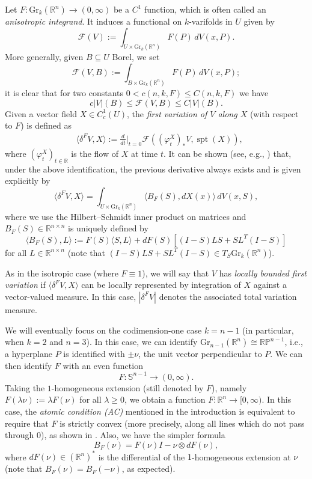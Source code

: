 \documentclass[11pt,a4paper]{amsart}
\newcommand{\R}{\mathbb{R}}
\newcommand{\ang}[1]{\langle#1\rangle}
\theoremstyle{definition}
\newcommand{\gr}{\text{Gr}_k(\R^n)}
\begin{document}
Let $F:\gr\to(0,\infty)$ be a $C^1$ function, which is often called an \emph{anisotropic integrand}.
It induces a functional on $k$-varifolds in $U$ given by
$$\mathcal{F}(V):=\int_{U\times\gr}F(P)\,dV(x,P).$$
More generally, given $B\subseteq U$ Borel, we set
$$\mathcal{F}(V,B):=\int_{B\times\gr}F(P)\,dV(x,P);$$
it is clear that for two constants $0<c(n,k,F)\le C(n,k,F)$ we have
$$c|V|(B)\le\mathcal{F}(V,B)\le C|V|(B).$$
Given a vector field $X\in C^1_c(U)$, the \emph{first variation of $V$ along $X$} (with respect to $F$) is defined as
\begin{align*}
	&\ang{\delta^F V,X}:=\frac{d}{dt}\Big|_{t=0}\mathcal F((\varphi_t^X)_*V,\operatorname{spt}(X)),
\end{align*}
where $(\varphi_t^X)_{t\in\R}$ is the flow of $X$ at time $t$. It can be shown (see, e.g., \cite[Lemma A.2]{DDG}) that, under the above identification, the previous derivative always exists and is given explicitly by
\begin{equation}\label{fv.bf}
    \ang{\delta^F V,X}=\int_{U\times\gr}\ang{B_F(S),dX(x)}\,dV(x,S),
\end{equation}
where we use the Hilbert--Schmidt inner product on matrices and $B_F(S)\in\R^{n\times n}$
is uniquely defined by
\begin{equation}\label{bf}
    \ang{B_F(S),L}:=F(S)\ang{S,L}+dF(S)[(I-S)LS+SL^T(I-S)]
\end{equation}
for all $L\in\R^{n\times n}$ (note that $(I-S)LS+SL^T(I-S)\in T_S\gr$).

As in the isotropic case (where $F\equiv 1$), we will say that $V$ has \emph{locally bounded first variation}
if $\ang{\delta^F V,X}$ can be locally represented by integration of $X$ against a vector-valued measure.
In this case, $|\delta^FV|$ denotes the associated total variation measure.

We will eventually focus on the codimension-one case $k=n-1$ (in particular, when $k=2$ and $n=3$).
In this case, we can identify $\text{Gr}_{n-1}(\R^n)\cong\mathbb{RP}^{n-1}$,
i.e., a hyperplane $P$ is identified with $\pm\nu$, the unit vector perpendicular to $P$.
We can then identify $F$ with an even function
$$F:\mathbb{S}^{n-1}\to(0,\infty).$$
Taking the $1$-homogeneous extension (still denoted by $F$), namely $F(\lambda\nu):=\lambda F(\nu)$
for all $\lambda\ge0$, we obtain a function $F:\R^n\to[0,\infty)$.
In this case, the \emph{atomic condition (AC)} mentioned in the introduction is equivalent to
require that $F$ is strictly convex (more precisely, along all lines which do not pass through $0$), as shown in
\cite[Theorem 1.3]{DDG}.
Also, we have the simpler formula
\begin{equation}\label{bf.hyper}
    B_F(\nu)=F(\nu)I-\nu\otimes dF(\nu),
\end{equation}
where $dF(\nu)\in(\R^n)^*$ is the differential of the $1$-homogeneous extension at $\nu$ (note that $B_F(\nu)=B_F(-\nu)$, as expected).
\end{document}
